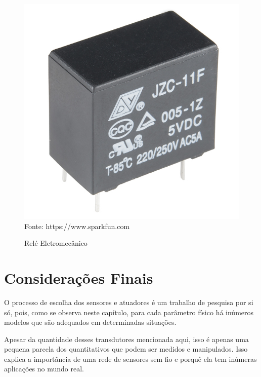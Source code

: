 \begin{figure}[h!]
	\caption{Relé Eletromecânico}
	\centering
	\includegraphics[scale=0.6]{../images/relay.jpg}
	\hspace{\linewidth}
	Fonte: https://www.sparkfun.com
	\label{figura:relay}
\end{figure}

\section{Considerações Finais}
O processo de escolha dos sensores e atuadores é um trabalho de pesquisa por si só, pois, como se observa
neste capítulo, para cada parâmetro físico há inúmeros modelos que são adequados em determinadas situações.

Apesar da quantidade desses transdutores mencionada aqui, isso é apenas uma pequena parcela dos quantitativos
que podem ser medidos e manipulados. Isso explica a importância de uma rede de sensores sem fio e porquê ela
tem inúmeras aplicações no mundo real.
